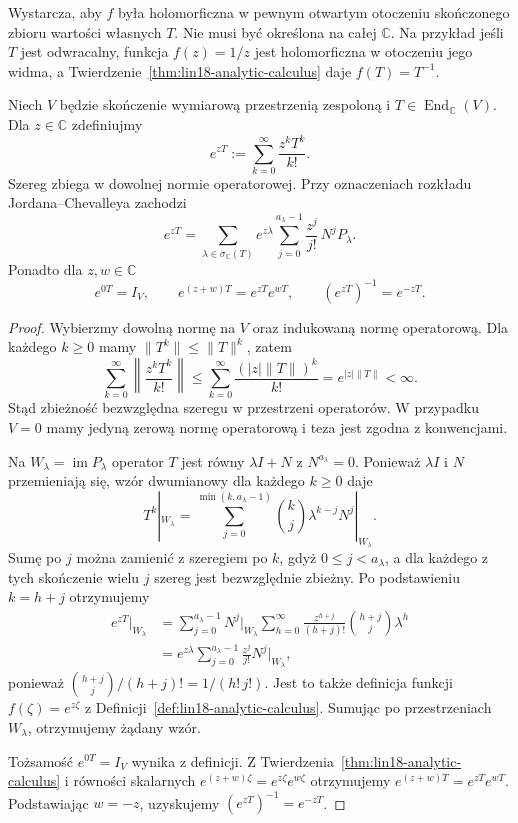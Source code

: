 \begin{uwaga}
\label{rem:lin18-domain}
Wystarcza, aby \(f\) była
holomorficzna w pewnym otwartym otoczeniu
skończonego zbioru wartości własnych \(T\).
Nie musi być określona na całej \(\mathbb C\).
Na przykład jeśli \(T\) jest odwracalny,
funkcja \(f(z)=1/z\) jest holomorficzna
w otoczeniu jego widma, a
Twierdzenie~\ref{thm:lin18-analytic-calculus}
daje \(f(T)=T^{-1}\).
\end{uwaga}

\begin{twierdzenie}
\label{thm:lin18-exponential}
Niech \(V\) będzie skończenie wymiarową
przestrzenią zespoloną i
\(T\in\operatorname{End}_{\mathbb C}(V)\).
Dla \(z\in\mathbb C\) zdefiniujmy
\[
 e^{zT}:=\sum_{k=0}^{\infty}
             \frac{z^kT^k}{k!}.
\]
Szereg zbiega w dowolnej normie operatorowej.
Przy oznaczeniach rozkładu
Jordana--Chevalleya zachodzi
\[
 e^{zT}=
 \sum_{\lambda\in\sigma_{\mathbb C}(T)}
 e^{z\lambda}
 \sum_{j=0}^{a_\lambda-1}
 \frac{z^j}{j!}\,N^jP_\lambda.
\]
Ponadto dla \(z,w\in\mathbb C\)
\[
 e^{0T}=I_V,\qquad
 e^{(z+w)T}=e^{zT}e^{wT},\qquad
 (e^{zT})^{-1}=e^{-zT}.
\]
\end{twierdzenie}
\begin{proof}
Wybierzmy dowolną normę na \(V\)
oraz indukowaną normę operatorową.
Dla każdego \(k\ge0\) mamy
\(\|T^k\|\le\|T\|^k\), zatem
\[
 \sum_{k=0}^{\infty}
 \left\|\frac{z^kT^k}{k!}\right\|
 \le
 \sum_{k=0}^{\infty}\frac{(|z|\|T\|)^k}{k!}
 =e^{|z|\|T\|}<\infty.
\]
Stąd zbieżność bezwzględna szeregu
w przestrzeni operatorów.
W przypadku \(V=0\) mamy jedyną
zerową normę operatorową i teza
jest zgodna z konwencjami.

Na \(W_\lambda=\operatorname{im}P_\lambda\)
operator \(T\) jest równy \(\lambda I+N\)
z \(N^{a_\lambda}=0\).
Ponieważ \(\lambda I\) i \(N\) przemieniają się,
wzór dwumianowy dla każdego \(k\ge0\) daje
\[
 T^k|_{W_\lambda}=
 \sum_{j=0}^{\min(k,a_\lambda-1)}
 \binom{k}{j}\lambda^{k-j}N^j|_{W_\lambda}.
\]
Sumę po \(j\) można zamienić z szeregiem
po \(k\), gdyż \(0\le j<a_\lambda\),
a dla każdego z tych skończenie wielu \(j\)
szereg jest bezwzględnie zbieżny.
Po podstawieniu \(k=h+j\) otrzymujemy
\[
 \begin{aligned}
 e^{zT}|_{W_\lambda}
 &=\sum_{j=0}^{a_\lambda-1}
     N^j|_{W_\lambda}
     \sum_{h=0}^{\infty}
       \frac{z^{h+j}}{(h+j)!}
       \binom{h+j}{j}\lambda^h\\
 &=e^{z\lambda}
   \sum_{j=0}^{a_\lambda-1}
       \frac{z^j}{j!}N^j|_{W_\lambda},
 \end{aligned}
\]
ponieważ
\(\binom{h+j}{j}/(h+j)!=1/(h!\,j!)\).
Jest to także definicja
funkcji \(f(\zeta)=e^{z\zeta}\)
z Definicji~\ref{def:lin18-analytic-calculus}.
Sumując po przestrzeniach \(W_\lambda\),
otrzymujemy żądany wzór.

Tożsamość \(e^{0T}=I_V\)
wynika z definicji.
Z
Twierdzenia~\ref{thm:lin18-analytic-calculus}
i równości skalarnych
\(e^{(z+w)\zeta}=e^{z\zeta}e^{w\zeta}\)
otrzymujemy
\(e^{(z+w)T}=e^{zT}e^{wT}\).
Podstawiając \(w=-z\), uzyskujemy
\((e^{zT})^{-1}=e^{-zT}\).
\end{proof}

